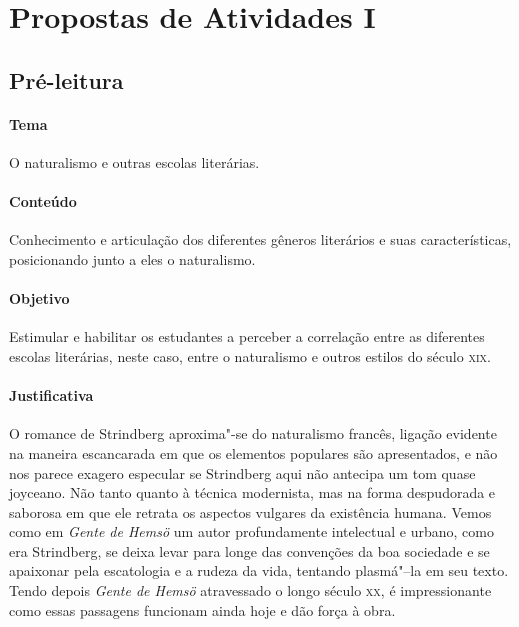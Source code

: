 \documentclass[12pt]{extarticle}
\begin{document}
\tableofcontents

\pagebreak
\section{Propostas de Atividades I}

\subsection{Pré-leitura}

\paragraph{Tema} O naturalismo e outras escolas literárias.

\paragraph{Conteúdo} Conhecimento e articulação dos diferentes gêneros 
literários e suas características, posicionando junto a eles o naturalismo. 

\paragraph{Objetivo} Estimular e habilitar os estudantes a perceber a 
correlação entre as diferentes escolas literárias, neste caso, entre o 
naturalismo e outros estilos do século \textsc{xix}.

\paragraph{Justificativa} O romance de Strindberg aproxima"-se do 
naturalismo francês, ligação evidente na maneira escancarada em que os 
elementos populares são apresentados, e não nos parece exagero
especular se Strindberg aqui não antecipa um tom quase joyceano. 
Não tanto quanto à técnica modernista, mas na forma despudorada e saborosa 
em que ele retrata os aspectos vulgares da existência humana.
Vemos como em \textit{Gente de Hemsö} um autor profundamente intelectual 
e urbano, como era Strindberg, se deixa levar para longe das convenções 
da boa sociedade e se apaixonar pela escatologia e a rudeza da vida,
tentando plasmá"--la em seu texto. Tendo depois \textit{Gente de Hemsö} 
atravessado o longo século \textsc{xx}, é impressionante como essas
passagens funcionam ainda hoje e dão força à obra. 
\end{document}
